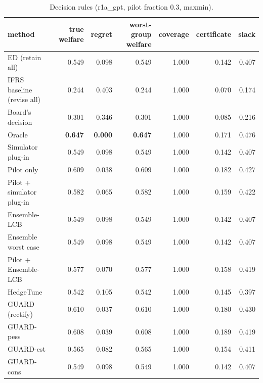 \begin{table}[t]
\centering
\small
\begin{tabular}{lrrrrrr}
\toprule
method & true welfare & regret & worst-group welfare & coverage & certificate & slack \\
\midrule
ED (retain all) & 0.549 & 0.098 & 0.549 & 1.000 & 0.142 & 0.407 \\
IFRS baseline (revise all) & 0.244 & 0.403 & 0.244 & 1.000 & 0.070 & 0.174 \\
Board's decision & 0.301 & 0.346 & 0.301 & 1.000 & 0.085 & 0.216 \\
Oracle & \textbf{0.647} & \textbf{0.000} & \textbf{0.647} & 1.000 & 0.171 & 0.476 \\
Simulator plug-in & 0.549 & 0.098 & 0.549 & 1.000 & 0.142 & 0.407 \\
Pilot only & 0.609 & 0.038 & 0.609 & 1.000 & 0.182 & 0.427 \\
Pilot + simulator plug-in & 0.582 & 0.065 & 0.582 & 1.000 & 0.159 & 0.422 \\
Ensemble-LCB & 0.549 & 0.098 & 0.549 & 1.000 & 0.142 & 0.407 \\
Ensemble worst case & 0.549 & 0.098 & 0.549 & 1.000 & 0.142 & 0.407 \\
Pilot + Ensemble-LCB & 0.577 & 0.070 & 0.577 & 1.000 & 0.158 & 0.419 \\
HedgeTune & 0.542 & 0.105 & 0.542 & 1.000 & 0.145 & 0.397 \\
GUARD (rectify) & 0.610 & 0.037 & 0.610 & 1.000 & 0.180 & 0.430 \\
GUARD-pess & 0.608 & 0.039 & 0.608 & 1.000 & 0.189 & 0.419 \\
GUARD-est & 0.565 & 0.082 & 0.565 & 1.000 & 0.154 & 0.411 \\
GUARD-cons & 0.549 & 0.098 & 0.549 & 1.000 & 0.142 & 0.407 \\
\bottomrule
\end{tabular}
\caption{Decision rules (r1a\_gpt, pilot fraction 0.3, maxmin).}
\label{tab:methods-maxmin}
\end{table}
